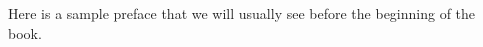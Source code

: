 
\begin{preface}
Here is a sample preface that we will usually see before the beginning of the book.
\author{Dr. PhD}
\date{October 2016}
\end{preface}

